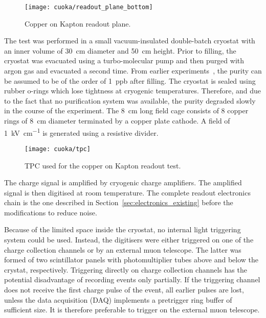 \begin{figure}[htb]
	\centering
	\texttt{[image: cuoka/readout\_plane\_bottom]}
	\caption{Copper on Kapton readout plane.}
	\label{fig:cuoka_readout-plane}
\end{figure}

The test was performed in a small vacuum-insulated double-batch cryostat with an inner volume of \SI{30}{\centi\metre} diameter and \SI{50}{\centi\metre} height.
Prior to filling, the cryostat was evacuated using a turbo-molecular pump and then purged with argon gas and evacuated a second time.
From earlier experiments~\cite{2photonAbs}, the purity can be assumed to be of the order of \SI{1}{ppb} after filling.
The cryostat is sealed using rubber o-rings which lose tightness at cryogenic temperatures.
Therefore, and due to the fact that no purification system was available, the purity degraded slowly in the course of the experiment.
The \SI{8}{\centi\metre} long field cage consists of \num{8} copper rings of \SI{8}{\centi\metre} diameter terminated by a copper plate cathode.
A field of \SI{1}{\kilo\volt\per\centi\metre} is generated using a resistive divider.

\begin{figure}[htb]
	\centering
	\texttt{[image: cuoka/tpc]}
	\caption{TPC used for the copper on Kapton readout test.}
	\label{fig:cuoka_tpc}
\end{figure}

The charge signal is amplified by cryogenic charge amplifiers.
The amplified signal is then digitised at room temperature.
The complete readout electronics chain is the one described in Section~\ref{sec:electronics_existing} before the modifications to reduce noise.

Because of the limited space inside the cryostat, no internal light triggering system could be used.
Instead, the digitisers were either triggered on one of the charge collection channels or by an external muon telescope.
The latter was formed of two scintillator panels with photomultiplier tubes above and below the crystat, respectively.
Triggering directly on charge collection channels has the potential disadvantage of recording events only partially.
If the triggering channel does not receive the first charge pulse of the event, all earlier pulses are lost, unless the data acquisition (DAQ) implements a pretrigger ring buffer of sufficient size.
It is therefore preferable to trigger on the external muon telescope.


